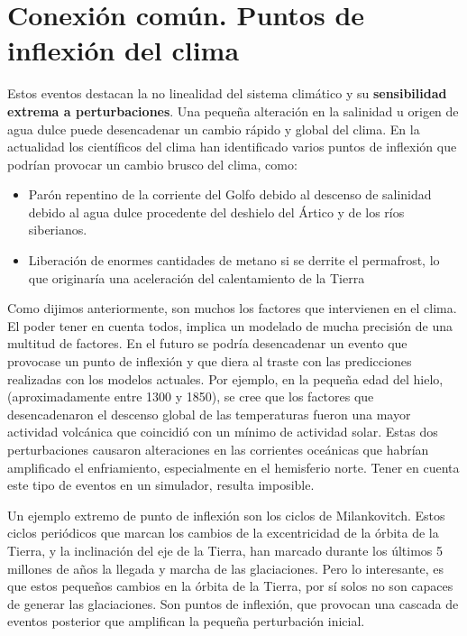 \documentclass[
  10pt,
  a4paper,
  DIV=11,
  numbers=noendperiod,
  open=any]{scrreprt}
\providecommand{\tightlist}{%
  \setlength{\itemsep}{0pt}\setlength{\parskip}{0pt}}
\numberwithin{equation}{chapter}
\numberwithin{equation}{chapter}
\renewcommand{\[}{\begin{equation}}
\renewcommand{\]}{\end{equation}}
\begin{document}
\section{Conexión común. Puntos de inflexión del
clima}\label{conexiuxf3n-comuxfan.-puntos-de-inflexiuxf3n-del-clima}

Estos eventos destacan la no linealidad del sistema climático y su
\textbf{sensibilidad extrema a perturbaciones}. Una pequeña alteración
en la salinidad u origen de agua dulce puede desencadenar un cambio
rápido y global del clima. En la actualidad los científicos del clima
han identificado varios puntos de inflexión que podrían provocar un
cambio brusco del clima, como:

\begin{itemize}
\tightlist
\item
  Parón repentino de la corriente del Golfo debido al descenso de
  salinidad debido al agua dulce procedente del deshielo del Ártico y de
  los ríos siberianos.
\item
  Liberación de enormes cantidades de metano si se derrite el
  permafrost, lo que originaría una aceleración del calentamiento de la
  Tierra
\end{itemize}

Como dijimos anteriormente, son muchos los factores que intervienen en
el clima. El poder tener en cuenta todos, implica un modelado de mucha
precisión de una multitud de factores. En el futuro se podría
desencadenar un evento que provocase un punto de inflexión y que diera
al traste con las predicciones realizadas con los modelos actuales. Por
ejemplo, en la pequeña edad del hielo, (aproximadamente entre 1300 y
1850), se cree que los factores que desencadenaron el descenso global de
las temperaturas fueron una mayor actividad volcánica que coincidió con
un mínimo de actividad solar. Estas dos perturbaciones causaron
alteraciones en las corrientes oceánicas que habrían amplificado el
enfriamiento, especialmente en el hemisferio norte. Tener en cuenta este
tipo de eventos en un simulador, resulta imposible.

Un ejemplo extremo de punto de inflexión son los ciclos de Milankovitch.
Estos ciclos periódicos que marcan los cambios de la excentricidad de la
órbita de la Tierra, y la inclinación del eje de la Tierra, han marcado
durante los últimos 5 millones de años la llegada y marcha de las
glaciaciones. Pero lo interesante, es que estos pequeños cambios en la
órbita de la Tierra, por sí solos no son capaces de generar las
glaciaciones. Son puntos de inflexión, que provocan una cascada de
eventos posterior que amplifican la pequeña perturbación inicial.
\end{document}
